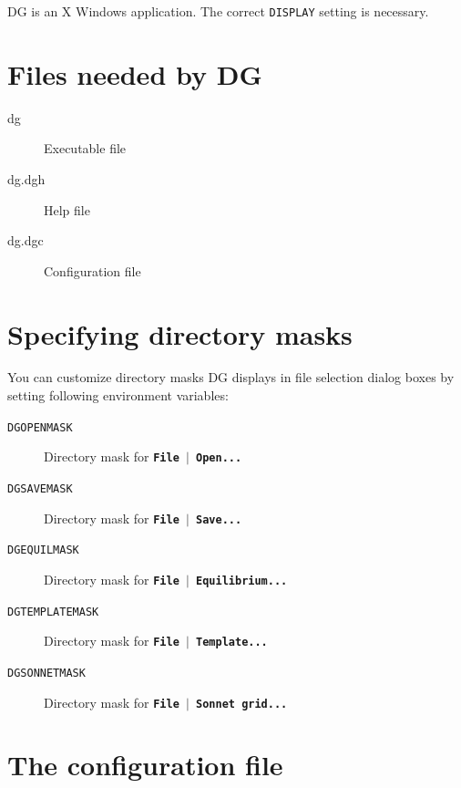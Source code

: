 \documentclass[12pt]{report}
\begin{document}
DG is an X Windows application. The correct \verb+DISPLAY+ setting is
necessary.

\section{Files needed by DG}

\begin{description}
  \item[dg] Executable file
  \item[dg.dgh] Help file
  \item[dg.dgc] Configuration file
\end{description}

\section{Specifying directory masks}

You can customize directory masks DG displays in file selection dialog
boxes by setting following environment variables:

\begin{description}
\item[\texttt{DGOPENMASK}] Directory mask for
\textbf{\texttt{File \begin{math}\vert{}\end{math} Open...}}
\item[\texttt{DGSAVEMASK}] Directory mask for
\textbf{\texttt{File \begin{math}\vert{}\end{math} Save...}}
\item[\texttt{DGEQUILMASK}] Directory mask for
\textbf{\texttt{File \begin{math}\vert{}\end{math} Equilibrium...}}
\item[\texttt{DGTEMPLATEMASK}] Directory mask for
\textbf{\texttt{File \begin{math}\vert{}\end{math} Template...}}
\item[\texttt{DGSONNETMASK}] Directory mask for
\textbf{\texttt{File \begin{math}\vert{}\end{math} Sonnet grid...}}
\end{description}

\section{The configuration file}
\end{document}
